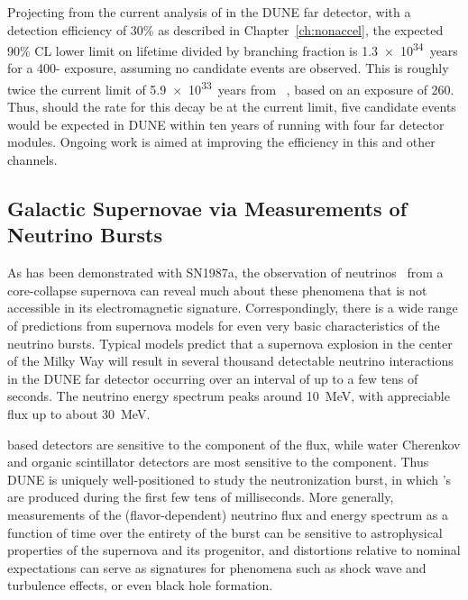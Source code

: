 Projecting from the current analysis of \ptoknubar in the DUNE 
far detector, with a detection efficiency of \num{30}\% as 
described in Chapter~\ref{ch:nonaccel}, the 
expected 90\% CL lower limit on lifetime divided by branching 
fraction is \SI{1.3e34}{years} for a 
\num{400}-\SI{}{\ktyr} 
exposure, assuming no candidate events are observed.  This 
is roughly twice the current limit of 
\SI{5.9e33}{years} from \superk~\cite{Abe:2014mwa}, 
based on an exposure of \SI{260}{\ktyr}.  Thus, should the rate 
for this decay be at the current \superk limit, five candidate 
events would be expected in DUNE within ten years 
of running with four far detector modules.  Ongoing work is aimed 
at improving the efficiency in this and other channels.

\subsection{Galactic Supernovae via Measurements of Neutrino Bursts}

As has been demonstrated with SN1987a, the observation 
of neutrinos~\cite{Bionta:1987qt,Hirata:1987hu} from a 
core-collapse supernova can reveal much about these  
phenomena that is not accessible in its  
electromagnetic signature.  Correspondingly, there is a 
wide range of predictions from supernova models for even 
very basic characteristics of the neutrino bursts.  Typical  
models predict that a supernova explosion in the 
center of the Milky Way will result in several thousand 
detectable neutrino interactions in the DUNE far detector 
occurring over an interval of up to a few tens of seconds.
The neutrino energy spectrum peaks around \SI{10}{MeV}, 
with appreciable flux up to about \SI{30}{MeV}.

\lar based detectors are sensitive to the \nue 
component of the flux, while water Cherenkov and organic 
scintillator detectors are most sensitive to the \anue 
component.  Thus DUNE is uniquely well-positioned to study the 
neutronization burst, in which \nue's are produced during the 
first few tens of milliseconds.  More generally,  
measurements of the (flavor-dependent) neutrino flux and energy 
spectrum as a function of time over the entirety of the burst 
can be sensitive to astrophysical properties of the supernova 
and its progenitor, and distortions relative to nominal 
expectations can serve as signatures for phenomena such 
as shock wave and turbulence effects, or even black hole 
formation.  

